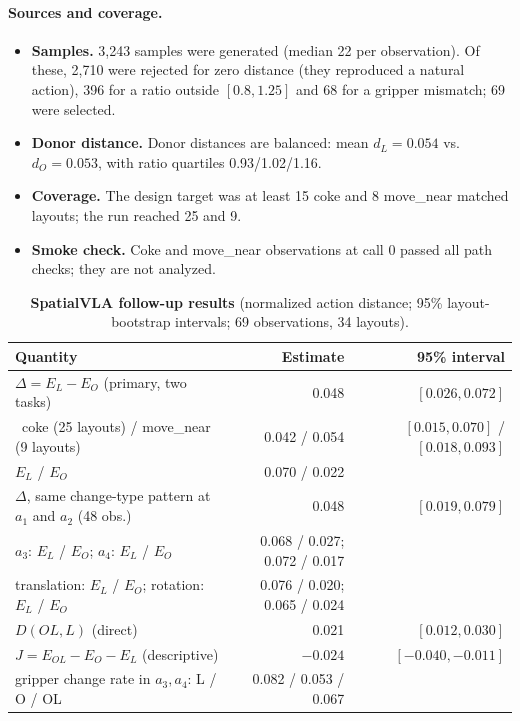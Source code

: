 \paragraph{Sources and coverage.}
\begin{itemize}
\item \textbf{Samples.} 3,243 samples were generated (median 22 per observation). Of these, 2,710 were rejected for zero distance (they reproduced a natural action), 396 for a ratio outside $[0.8,1.25]$ and 68 for a gripper mismatch; 69 were selected.
\item \textbf{Donor distance.} Donor distances are balanced: mean $d_L=0.054$ vs.\ $d_O=0.053$, with ratio quartiles 0.93/1.02/1.16.
\item \textbf{Coverage.} The design target was at least 15 coke and 8 move\_near matched layouts; the run reached 25 and 9.
\item \textbf{Smoke check.} Coke and move\_near observations at call 0 passed all path checks; they are not analyzed.
\end{itemize}

\begin{table}[h]
\centering\small
\caption{\textbf{SpatialVLA follow-up results} (normalized action distance; 95\% layout-bootstrap intervals; 69 observations, 34 layouts).}
\label{tab:svla2res}
\begin{tabular}{@{}lrr@{}}\toprule
Quantity & Estimate & 95\% interval\\\midrule
$\Delta=E_L-E_O$ (primary, two tasks) & 0.048 & $[0.026,0.072]$\\
\ coke (25 layouts) / move\_near (9 layouts) & 0.042 / 0.054 & $[0.015,0.070]$ / $[0.018,0.093]$\\
$E_L$ / $E_O$ & 0.070 / 0.022 & \\
$\Delta$, same change-type pattern at $a_1$ and $a_2$ (48 obs.) & 0.048 & $[0.019,0.079]$\\
$a_3$: $E_L$ / $E_O$; $a_4$: $E_L$ / $E_O$ & 0.068 / 0.027; 0.072 / 0.017 & \\
translation: $E_L$ / $E_O$; rotation: $E_L$ / $E_O$ & 0.076 / 0.020; 0.065 / 0.024 & \\
$D(OL,L)$ (direct) & 0.021 & $[0.012,0.030]$\\
$J=E_{OL}-E_O-E_L$ (descriptive) & $-0.024$ & $[-0.040,-0.011]$\\
gripper change rate in $a_3,a_4$: L / O / OL & 0.082 / 0.053 / 0.067 & \\\bottomrule
\end{tabular}
\end{table}

